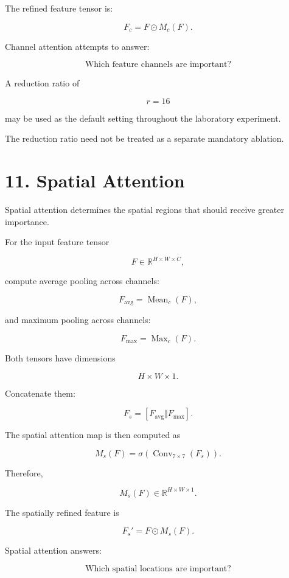 \documentclass[10pt]{article}
\begin{document}
The refined feature tensor is:

\[
F_c
=
F\odot M_c(F).
\]

Channel attention attempts to answer:

\[
\boxed{\text{Which feature channels are important?}}
\]

A reduction ratio of

\[
r=16
\]

may be used as the default setting throughout the laboratory experiment.

The reduction ratio need not be treated as a separate mandatory ablation.

\section*{11. Spatial Attention}

Spatial attention determines the spatial regions that should receive greater
importance.

For the input feature tensor

\[
F\in\mathbb{R}^{H\times W\times C},
\]

compute average pooling across channels:

\[
F_{\mathrm{avg}}
=
\operatorname{Mean}_{c}(F),
\]

and maximum pooling across channels:

\[
F_{\mathrm{max}}
=
\operatorname{Max}_{c}(F).
\]

Both tensors have dimensions

\[
H\times W\times1.
\]

Concatenate them:

\[
F_s
=
[
F_{\mathrm{avg}}
\Vert
F_{\mathrm{max}}
].
\]

The spatial attention map is then computed as

\[
M_s(F)
=
\sigma
\left(
\operatorname{Conv}_{7\times7}(F_s)
\right).
\]

Therefore,

\[
M_s(F)
\in
\mathbb{R}^{H\times W\times1}.
\]

The spatially refined feature is

\[
F_s'
=
F\odot M_s(F).
\]

Spatial attention answers:

\[
\boxed{\text{Which spatial locations are important?}}
\]

\end{document}
